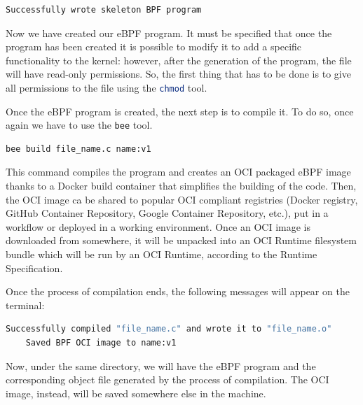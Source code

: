 \begin{lstlisting}[style=commandline, language=bash, caption={Successful program creation message using \colorbox{backcolour}{\lstinline[style=commandline, language=bash]|bee|}.}]
	Successfully wrote skeleton BPF program
\end{lstlisting}

Now we have created our eBPF program.
It must be specified that once the program has been created it is possible to modify it to add a specific functionality to the kernel: however, after the generation of the program, the file will have read-only permissions.
So, the first thing that has to be done is to give all permissions to the file using the \colorbox{backcolour}{\lstinline[style=commandline, language=bash, breaklines=true]|chmod|} tool.

Once the eBPF program is created, the next step is to compile it.
To do so, once again we have to use the \colorbox{backcolour}{\lstinline[style=commandline, language=bash, breaklines=true]|bee|} tool.

\begin{lstlisting}[style=commandline, language=bash, caption={\colorbox{backcolour}{\lstinline[style=commandline, language=bash]|bee|} build command.}]
	bee build file_name.c name:v1
\end{lstlisting}

This command compiles the program and creates an OCI packaged eBPF image thanks to a Docker build container that simplifies the building of the code.
Then, the OCI image ca be shared to popular OCI compliant registries (Docker registry, GitHub Container Repository, Google Container Repository, etc.), put in a workflow or deployed in a working environment.
Once an OCI image is downloaded from somewhere, it will be unpacked into an OCI Runtime filesystem bundle which will be run by an OCI Runtime, according to the Runtime Specification.

Once the process of compilation ends, the following messages will appear on the terminal: 

\begin{lstlisting}[style=commandline, language=bash, caption={Successful OCI image creation messages using \colorbox{backcolour}{\lstinline[style=commandline, language=bash]|bee|}.}]
	Successfully compiled "file_name.c" and wrote it to "file_name.o"
	Saved BPF OCI image to name:v1
\end{lstlisting}

Now, under the same directory, we will have the eBPF program and the corresponding object file generated by the process of compilation.
The OCI image, instead, will be saved somewhere else in the machine.

